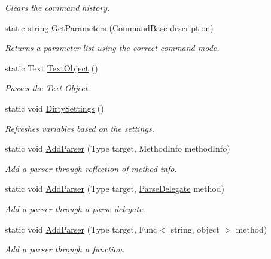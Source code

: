 \begin{DoxyCompactItemize}
\begin{DoxyCompactList}\small\item\em Clears the command history. \end{DoxyCompactList}\item 
static string \hyperlink{class_developer_console_1_1_dev_console_a2cae3e00ffac10262d3c47b0ca4a7390}{Get\+Parameters} (\hyperlink{class_developer_console_1_1_core_1_1_command_base}{Command\+Base} description)
\begin{DoxyCompactList}\small\item\em Returns a parameter list using the correct command mode. \end{DoxyCompactList}\item 
static Text \hyperlink{class_developer_console_1_1_dev_console_aa561857615c2986c60519c4b1ef92b38}{Text\+Object} ()
\begin{DoxyCompactList}\small\item\em Passes the Text Object. \end{DoxyCompactList}\item 
static void \hyperlink{class_developer_console_1_1_dev_console_aa4212f80280155e1b14e57b16d81863f}{Dirty\+Settings} ()
\begin{DoxyCompactList}\small\item\em Refreshes variables based on the settings. \end{DoxyCompactList}\item 
static void \hyperlink{class_developer_console_1_1_dev_console_a46515b54112416427bb3bc5426b4a15f}{Add\+Parser} (Type target, Method\+Info method\+Info)
\begin{DoxyCompactList}\small\item\em Add a parser through reflection of method info. \end{DoxyCompactList}\item 
static void \hyperlink{class_developer_console_1_1_dev_console_abc72c2f73347121d6b25f06f0591584f}{Add\+Parser} (Type target, \hyperlink{namespace_developer_console_a62e10d7e4aeed7c6bcd4a780468c74fa}{Parse\+Delegate} method)
\begin{DoxyCompactList}\small\item\em Add a parser through a parse delegate. \end{DoxyCompactList}\item 
static void \hyperlink{class_developer_console_1_1_dev_console_a4183b27cc77ec3b4aad8bdc9f11c33b8}{Add\+Parser} (Type target, Func$<$ string, object $>$ method)
\begin{DoxyCompactList}\small\item\em Add a parser through a function. \end{DoxyCompactList}\end{DoxyCompactItemize}
